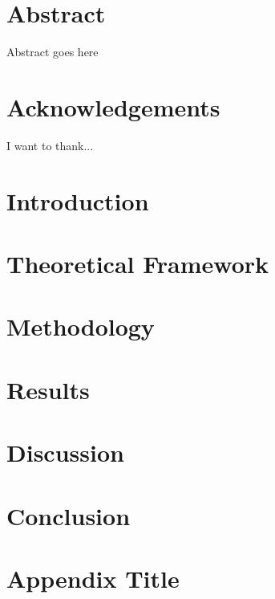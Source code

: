 \documentclass[a4paper,12pt,twoside]{report}
\begin{document}


\chapter*{Abstract}
Abstract goes here

\chapter*{Acknowledgements}
I want to thank...

\tableofcontents
\listoffigures

\listoftables

\chapter{Introduction}


\chapter{Theoretical Framework}


\chapter{Methodology}


\chapter{Results}


\chapter{Discussion}


\chapter{Conclusion}


\appendix
\chapter{Appendix Title}


\printbibliography
\end{document}
